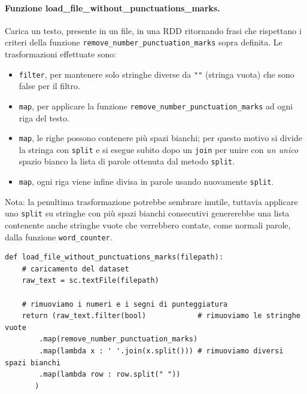\documentclass[titlepage]{article}
\begin{document}
\paragraph{Funzione load\_file\_without\_punctuations\_marks.}
Carica un testo, presente in un file, in una RDD ritornando frasi che rispettano i criteri della funzione \texttt{remove\_number\_punctuation\_marks} sopra definita. Le trasformazioni effettuate sono:
\begin{itemize}
    \item \texttt{filter}, per mantenere solo stringhe diverse da \texttt{""} (stringa vuota) che sono false per il filtro.
    \item \texttt{map}, per applicare la funzione \texttt{remove\_number\_punctuation\_marks} ad ogni riga del testo. 
    \item \texttt{map}, le righe possono contenere più spazi bianchi; per questo motivo si divide la stringa con \texttt{split} e si esegue subito dopo un \texttt{join} per unire con \emph{un unico} spazio bianco la lista di parole ottenuta dal metodo \texttt{split}.
    \item \texttt{map}, ogni riga viene infine divisa in parole usando nuovamente \texttt{split}.
\end{itemize}
Nota: la penultima trasformazione potrebbe sembrare inutile, tuttavia applicare uno \texttt{split} su stringhe con più spazi bianchi consecutivi genererebbe una lista contenente anche stringhe vuote che verrebbero contate, come normali parole, dalla funzione \texttt{word\_counter}.
\begin{verbatim}
def load_file_without_punctuations_marks(filepath):
    # caricamento del dataset
    raw_text = sc.textFile(filepath)

    # rimuoviamo i numeri e i segni di punteggiatura
    return (raw_text.filter(bool)            # rimuoviamo le stringhe vuote
        .map(remove_number_punctuation_marks)
        .map(lambda x : ' '.join(x.split())) # rimuoviamo diversi spazi bianchi
        .map(lambda row : row.split(" "))
       )
\end{verbatim}
\end{document}
